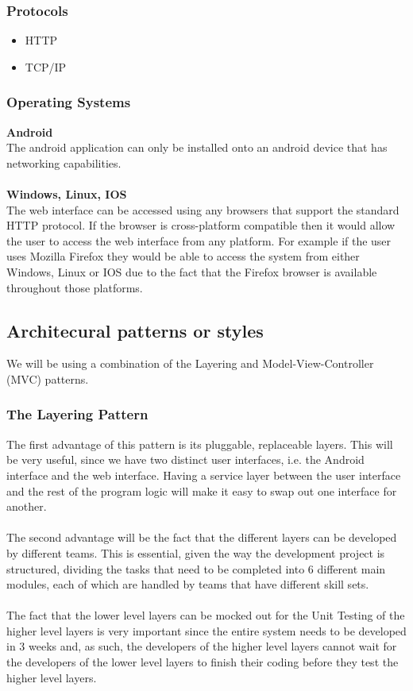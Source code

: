 \documentclass{article}
\begin{document}
	\subsubsection*{Protocols}
  
	\begin{itemize}
	  \item{HTTP}
	  \item{TCP/IP}
	\end{itemize}
	
	\subsubsection*{Operating Systems}
	
	\textbf{Android} \\
	The android application can only be installed onto an android device that has networking capabilities.
	\\ \\
	\textbf{Windows, Linux, IOS} 
	\\
	The web interface can be accessed using any browsers that support the standard HTTP protocol. If the browser is cross-platform 
	compatible then it would allow the user to access the web interface from any platform. For example if the user uses Mozilla Firefox
	they would be able to access the system from either Windows, Linux or IOS due to the fact that the Firefox browser is available
	throughout those platforms.

\subsection{Architecural patterns or styles}
We will be using a combination of the Layering and Model-View-Controller (MVC) patterns.

\subsubsection{The Layering Pattern}
The first advantage of this pattern is its pluggable, replaceable layers. This will be very useful, since we have two distinct user interfaces, i.e. the Android interface and the web interface. Having a service layer between the user interface and the rest of the program logic will make it easy to swap out one interface for another.\\ \\
The second advantage will be the fact that the different layers can be developed by different teams. This is essential, given the way the development project is structured, dividing the tasks that need to be completed into 6 different main modules, each of which are handled by teams that have different skill sets. \\ \\
The fact that the lower level layers can be mocked out for the Unit Testing of the higher level layers is very important since the entire system needs to be developed in 3 weeks and, as such, the developers of the higher level layers cannot wait for the developers of the lower level layers to finish their coding before they test the higher level layers.\\
\end{document}
